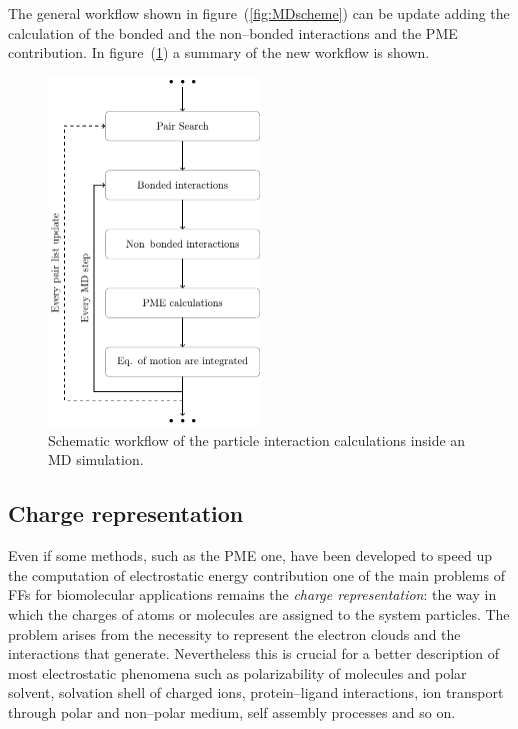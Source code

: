 The general workflow shown in figure~(\ref{fig:MDscheme}) can be update adding the calculation of the bonded and the non--bonded interactions and the \ac{PME} contribution. In figure~(\ref{fig:PPCore}) a summary of the new workflow is shown.
\begin{figure}[ht!]
	\center
	\includegraphics[width=0.5\textwidth]{./img/Schemi/PPCores}
	\caption{Schematic workflow of the particle interaction calculations inside an \acs{MD} simulation.}
	\label{fig:PPCore}
\end{figure}

\subsection{Charge representation}
\label{sec:chargeRep}
Even if some methods, such as the \ac{PME} one, have been developed to speed up the computation of electrostatic
energy contribution one of the main problems of \acp{FF} for biomolecular applications remains the \textit{charge
representation}: the way in which the charges of atoms or molecules are assigned to the system particles. The
problem arises from the necessity to represent the electron clouds and the interactions that generate.
Nevertheless this is crucial for a better description of most electrostatic phenomena such as polarizability of
molecules and polar solvent, solvation shell of charged ions, protein--ligand interactions, ion transport through
polar and non--polar medium, self assembly processes and so on.

